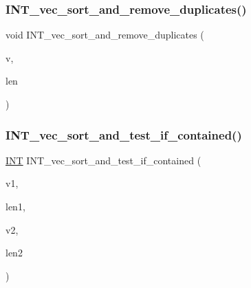 \subsubsection{\texorpdfstring{I\+N\+T\+\_\+vec\+\_\+sort\+\_\+and\+\_\+remove\+\_\+duplicates()}{INT\_vec\_sort\_and\_remove\_duplicates()}}
{\footnotesize\ttfamily void I\+N\+T\+\_\+vec\+\_\+sort\+\_\+and\+\_\+remove\+\_\+duplicates (\begin{DoxyParamCaption}\item[{\mbox{\hyperlink{galois_8h_a09fddde158a3a20bd2dcadb609de11dc}{I\+NT}} $\ast$}]{v,  }\item[{\mbox{\hyperlink{galois_8h_a09fddde158a3a20bd2dcadb609de11dc}{I\+NT}} \&}]{len }\end{DoxyParamCaption})}

\mbox{\label{sorting_8_c_aa8b6dcb22480872d7cc0f7d2354026af}} 
\subsubsection{\texorpdfstring{I\+N\+T\+\_\+vec\+\_\+sort\+\_\+and\+\_\+test\+\_\+if\+\_\+contained()}{INT\_vec\_sort\_and\_test\_if\_contained()}}
{\footnotesize\ttfamily \mbox{\hyperlink{galois_8h_a09fddde158a3a20bd2dcadb609de11dc}{I\+NT}} I\+N\+T\+\_\+vec\+\_\+sort\+\_\+and\+\_\+test\+\_\+if\+\_\+contained (\begin{DoxyParamCaption}\item[{\mbox{\hyperlink{galois_8h_a09fddde158a3a20bd2dcadb609de11dc}{I\+NT}} $\ast$}]{v1,  }\item[{\mbox{\hyperlink{galois_8h_a09fddde158a3a20bd2dcadb609de11dc}{I\+NT}}}]{len1,  }\item[{\mbox{\hyperlink{galois_8h_a09fddde158a3a20bd2dcadb609de11dc}{I\+NT}} $\ast$}]{v2,  }\item[{\mbox{\hyperlink{galois_8h_a09fddde158a3a20bd2dcadb609de11dc}{I\+NT}}}]{len2 }\end{DoxyParamCaption})}

\mbox{\label{sorting_8_c_ad0b54ef8fcaf7cce5577c97d1edbf1f5}} 
